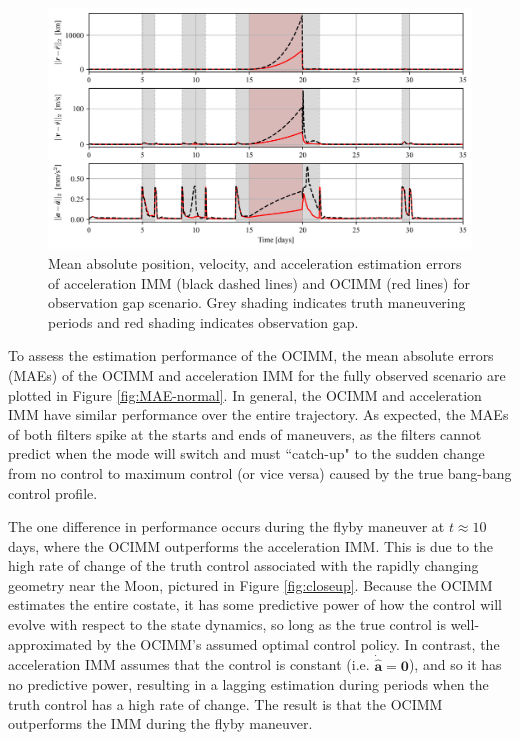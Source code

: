 \documentclass[letterpaper, preprint, paper,11pt]{AAS}	%
\begin{document}
\begin{figure}
    \centering
    \includegraphics[width=1\linewidth]{Figures/MAE_gap.png}
    \caption{Mean absolute position, velocity, and acceleration estimation errors of acceleration IMM (black dashed lines) and OCIMM (red lines) for observation gap scenario. Grey shading indicates truth maneuvering periods and red shading indicates observation gap.}
    \label{fig:MAE-gap}
\end{figure}

To assess the estimation performance of the OCIMM, the mean absolute errors (MAEs) of  the OCIMM and acceleration IMM for the fully observed scenario are plotted in Figure \ref{fig:MAE-normal}. In general, the OCIMM and acceleration IMM have similar performance over the entire trajectory. As expected, the MAEs of both filters spike at the starts and ends of maneuvers, as the filters cannot predict when the mode will switch and must ``catch-up" to the sudden change from no control to maximum control (or vice versa) caused by the true bang-bang control profile.

The one difference in performance occurs during the flyby maneuver at $t\approx 10$ days, where the OCIMM outperforms the acceleration IMM. This is due to the high rate of change of the truth control associated with the rapidly changing geometry near the Moon, pictured in Figure \ref{fig:closeup}. Because the OCIMM estimates the entire costate, it has some predictive power of how the control will evolve with respect to the state dynamics, so long as the true control is well-approximated by the OCIMM's assumed optimal control policy. In contrast, the acceleration IMM assumes that the control is constant (i.e. $\dot{\hat{\bm{a}}} = \bm{0}$), and so it has no predictive power, resulting in a lagging estimation during periods when the truth control has a high rate of change. The result is that the OCIMM outperforms the IMM during the flyby maneuver. 
\end{document}
